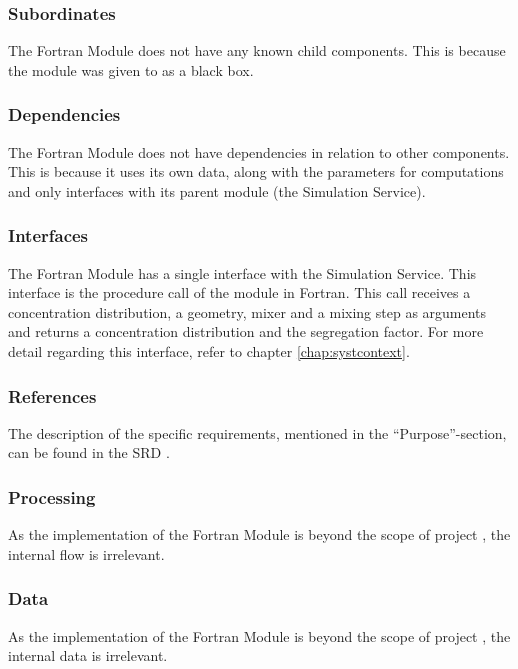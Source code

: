 \subsubsection*{Subordinates}
The Fortran Module does not have any known child components. This is because the module was given to \projectauthor{} as a black box.

\subsubsection*{Dependencies}
The Fortran Module does not have dependencies in relation to other components. This is because it uses its own data, along with the parameters for computations and only interfaces with its parent module (the Simulation Service).

\subsubsection*{Interfaces}
The Fortran Module has a single interface with the Simulation Service. This interface is the procedure call of the module in Fortran. This call receives a concentration distribution, a geometry, mixer and a mixing step as arguments and returns a concentration distribution and the segregation factor. For more detail regarding this interface, refer to chapter \ref{chap:systcontext}.

\subsubsection*{References}
The description of the specific requirements, mentioned in the ``Purpose''-section, can be found in the SRD \cite{srd}.

\subsubsection*{Processing}
As the implementation of the Fortran Module is beyond the scope of project \projectname{}, the internal flow is irrelevant.

\subsubsection*{Data}
As the implementation of the Fortran Module is beyond the scope of project \projectname{}, the internal data is irrelevant.

